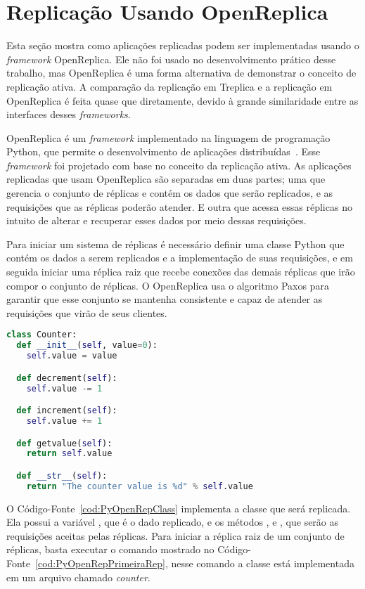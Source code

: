 \section{Replicação Usando OpenReplica}
\label{sec:openreplica}

Esta seção mostra como aplicações replicadas podem ser implementadas usando o \emph{framework} OpenReplica. Ele não foi usado no desenvolvimento prático desse trabalho, mas OpenReplica é uma forma alternativa de demonstrar o conceito de replicação ativa. A comparação da replicação em Treplica e a replicação em OpenReplica é feita quase que diretamente, devido à grande similaridade entre as interfaces desses \emph{frameworks}.

OpenReplica é um \emph{framework} implementado na linguagem de programação Python, que permite o desenvolvimento de aplicações distribuídas~\cite{altinbuken2012commodifying}. Esse \emph{framework} foi projetado com base no conceito da replicação ativa. As aplicações replicadas que usam OpenReplica são separadas em duas partes; uma que gerencia o conjunto de réplicas e contém os dados que serão replicados, e as requisições que as réplicas poderão atender. E outra que acessa essas réplicas no intuito de alterar e recuperar esses dados por meio dessas requisições.

Para iniciar um sistema de réplicas é necessário definir uma classe Python que contém os dados a serem replicados e a implementação de suas requisições, e em seguida iniciar uma réplica raiz que recebe conexões das demais réplicas que irão compor o conjunto de réplicas. O OpenReplica usa o algoritmo Paxos para garantir que esse conjunto se mantenha consistente e capaz de atender as requisições que virão de seus clientes.

\begin{lstlisting}[language=Python, caption={Classe com dados que serão replicados e suas requisições}, label={cod:PyOpenRepClass}]
class Counter:
  def __init__(self, value=0):
    self.value = value

  def decrement(self):
    self.value -= 1

  def increment(self):
    self.value += 1

  def getvalue(self):
    return self.value

  def __str__(self):
    return "The counter value is %d" % self.value
\end{lstlisting}

O Código-Fonte~\ref{cod:PyOpenRepClass} implementa a classe  que será replicada. Ela possui a variável , que é o dado replicado, e os métodos ,  e , que serão as requisições aceitas pelas réplicas. Para iniciar a réplica raiz de um conjunto de réplicas, basta executar o comando mostrado no Código-Fonte~\ref{cod:PyOpenRepPrimeiraRep}, nesse comando a classe  está implementada em um arquivo chamado \emph{counter}.

